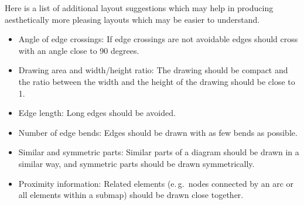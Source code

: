 Here is a list of additional layout suggestions which may help in producing aesthetically more pleasing layouts which may be easier to understand.

\begin{itemize}
  \item Angle of edge crossings: If edge crossings are not avoidable edges should cross with an angle close to 90 degrees.
  \item Drawing area and width/height ratio: The drawing should be compact and the ratio between the width and the height of the drawing should be close to 1.
  \item Edge length: Long edges should be avoided.
  \item Number of edge bends: Edges should be drawn with as few bends as possible.
  \item Similar and symmetric parts: Similar parts of a diagram should be drawn in a similar way, and symmetric parts should be drawn symmetrically.
  \item Proximity information: Related elements (e.\,g.~nodes connected by an arc or all elements within a submap) should be drawn close together.
\end{itemize} 
